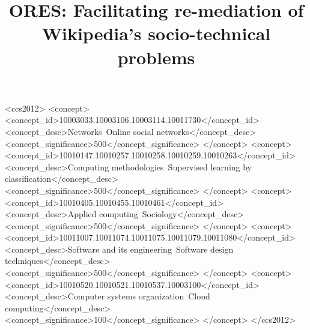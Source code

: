 \documentclass[format=sigchi, review=false, screen=true]{acmart}
\begin{document}
\title[ORES]{ORES: Facilitating re-mediation of Wikipedia's socio-technical problems}




\begin{abstract}

\end{abstract}


%
%
\begin{CCSXML}
<ccs2012>
<concept>
<concept_id>10003033.10003106.10003114.10011730</concept_id>
<concept_desc>Networks~Online social networks</concept_desc>
<concept_significance>500</concept_significance>
</concept>
<concept>
<concept_id>10010147.10010257.10010258.10010259.10010263</concept_id>
<concept_desc>Computing methodologies~Supervised learning by classification</concept_desc>
<concept_significance>500</concept_significance>
</concept>
<concept>
<concept_id>10010405.10010455.10010461</concept_id>
<concept_desc>Applied computing~Sociology</concept_desc>
<concept_significance>500</concept_significance>
</concept>
<concept>
<concept_id>10011007.10011074.10011075.10011079.10011080</concept_id>
<concept_desc>Software and its engineering~Software design techniques</concept_desc>
<concept_significance>500</concept_significance>
</concept>
<concept>
<concept_id>10010520.10010521.10010537.10003100</concept_id>
<concept_desc>Computer systems organization~Cloud computing</concept_desc>
<concept_significance>100</concept_significance>
</concept>
</ccs2012>
\end{CCSXML}



%
%



\maketitle


\end{document}
